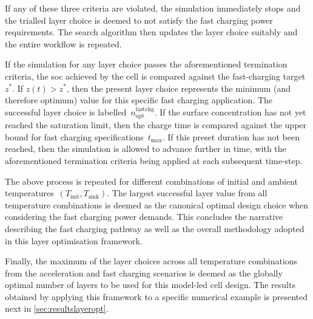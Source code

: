 If any  of these three criteria  are violated, the simulation  immediately stops
and the trialled layer  choice is deemed to not satisfy  the fast charging power
requirements. The  search algorithm then  updates the layer choice  suitably and
the entire workflow is repeated.

If the  simulation for  any layer choice  passes the  aforementioned termination
criteria,  the  \gls{soc}   achieved  by  the  cell  is   compared  against  the
fast-charging   target~$z^\ast$.  If   $z(t)   >  z^\ast$,   then  the   present
layer  choice  represents   the  minimum  (and  therefore   optimum)  value  for
this  specific  fast  charging  application.  The  successful  layer  choice  is
labelled~$n_\text{opt}^\text{fastchg}$. If the surface concentration has not yet
reached the saturation limit, then the charge time is compared against the upper
bound for  fast charging specifications~$t_\text{max}$. If  this preset duration
has not been reached, then the simulation is allowed to advance further in time,
with the  aforementioned termination criteria  being applied at  each subsequent
time-step.

The above process is repeated for  different combinations of initial and ambient
temperatures~\mbox{$(T_\text{init},  T_\text{sink})$}.  The  largest  successful
layer value from all temperature combinations is deemed as the canonical optimal
design choice when  considering the fast charging power  demands. This concludes
the  narrative describing  the  fast charging  pathway as  well  as the  overall
methodology adopted in this layer optimisation framework.

Finally, the  maximum of the  layer choices across all  temperature combinations
from the  acceleration and  fast charging  scenarios is  deemed as  the globally
optimal number of layers to be used  for this model-led cell design. The results
obtained by applying this framework to a specific numerical example is presented
next in \cref{sec:resultslayeropt}.


